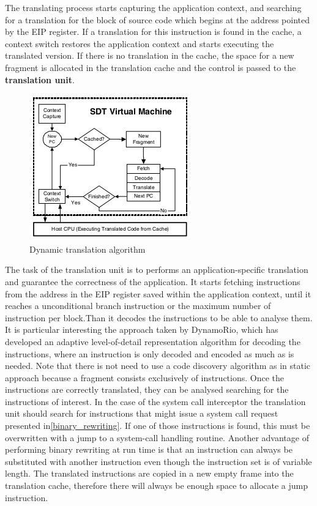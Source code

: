 The translating process starts capturing the application context, and searching for a translation for the block of source code which begins at the address pointed by the EIP register. If a translation for this instruction is found in the cache, a context switch restores the application context and starts executing the translated version.  If there is no translation in the cache, the space for a new fragment is allocated in the translation cache and the control is passed to the \textbf{translation unit}.

\begin{figure}[t]
\centering
\includegraphics[scale=1]{Chapter3/Chapter3Figs/dynamic_algorithm.png} 
\caption{Dynamic translation algorithm}
\label{fig:dynamic translation algorithm}
\end{figure}

The task of the translation unit is to performs an application-specific translation and guarantee the correctness of the application. It starts fetching instructions from the address in the EIP register saved within the application context, until it reaches a  unconditional branch instruction or the maximum number of instruction per block.Than it decodes the instructions to be able to analyse them. It is particular interesting the approach taken by DynamoRio, which has developed an adaptive level-of-detail representation algorithm for decoding the instructions, where an instruction is only decoded and encoded as much as is needed. Note that there is not need to use a code discovery algorithm as in static approach because a fragment consists exclusively of instructions. Once the instructions are correctly translated,  they can be analysed searching for the instructions of interest. In the case of the system call interceptor the translation unit should search for instructions that might issue a system call request presented in\ref{binary_rewriting}. If one of those instructions is found, this must be overwritten with a jump to a system-call handling routine. Another advantage of performing binary rewriting at run time is that an instruction can always be substituted with another instruction even though the instruction set is of variable length. The translated instructions are copied in a new empty frame into the translation cache, therefore  there will always be enough space to allocate a jump instruction.   

